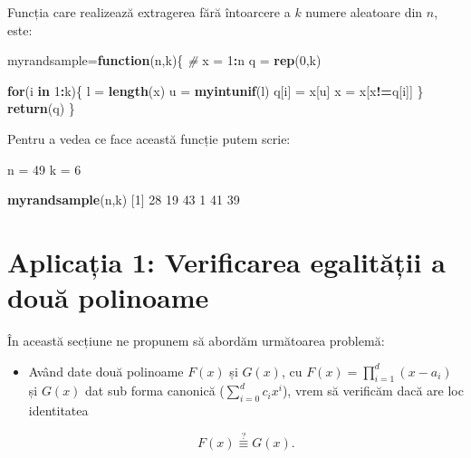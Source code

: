 \documentclass[]{article}
\newenvironment{Shaded}{\begin{snugshade}}{\end{snugshade}}
\newcommand{\KeywordTok}[1]{\textcolor[rgb]{0.13,0.29,0.53}{\textbf{#1}}}
\newcommand{\DecValTok}[1]{\textcolor[rgb]{0.00,0.00,0.81}{#1}}
\newcommand{\StringTok}[1]{\textcolor[rgb]{0.31,0.60,0.02}{#1}}
\newcommand{\CommentTok}[1]{\textcolor[rgb]{0.56,0.35,0.01}{\textit{#1}}}
\newcommand{\ControlFlowTok}[1]{\textcolor[rgb]{0.13,0.29,0.53}{\textbf{#1}}}
\newcommand{\OperatorTok}[1]{\textcolor[rgb]{0.81,0.36,0.00}{\textbf{#1}}}
\newcommand{\NormalTok}[1]{#1}
\newenvironment{frshaded*}{%
  \def\FrameCommand{\fboxrule=\FrameRule\fboxsep=\FrameSep \fcolorbox{framecolor}{shadecolor1}}%
  \MakeFramed {\advance\hsize-\width \FrameRestore}}%
{\endMakeFramed}
\newenvironment{rmdblock}[1]
  {\begin{frshaded*}
  \begin{itemize}
  \renewcommand{\labelitemi}{
    \raisebox{-.7\height}[0pt][0pt]{
      {\setkeys{Gin}{width=2em,keepaspectratio}\texttt{[image: images/icons/\#1]}}
    }
  }
  \item
  }
  {
  \end{itemize}
  \end{frshaded*}
  }
\newenvironment{rmdexercise}
  {\begin{rmdblock}{exercise}}
  {\end{rmdblock}}
\begin{document}
Funcția care realizează extragerea fără întoarcere a \(k\) numere
aleatoare din \(n\), este:

\begin{Shaded}
\begin{Highlighting}[]
\NormalTok{myrandsample=}\ControlFlowTok{function}\NormalTok{(n,k)\{}
  \CommentTok{# }
\NormalTok{  x =}\StringTok{ }\DecValTok{1}\OperatorTok{:}\NormalTok{n}
\NormalTok{  q =}\StringTok{ }\KeywordTok{rep}\NormalTok{(}\DecValTok{0}\NormalTok{,k)}
  
  \ControlFlowTok{for}\NormalTok{(i }\ControlFlowTok{in} \DecValTok{1}\OperatorTok{:}\NormalTok{k)\{}
\NormalTok{    l =}\StringTok{ }\KeywordTok{length}\NormalTok{(x)}
\NormalTok{    u =}\StringTok{ }\KeywordTok{myintunif}\NormalTok{(l)}
\NormalTok{    q[i] =}\StringTok{ }\NormalTok{x[u]}
\NormalTok{    x =}\StringTok{ }\NormalTok{x[x}\OperatorTok{!=}\NormalTok{q[i]]}
\NormalTok{  \}}
  \KeywordTok{return}\NormalTok{(q)}
\NormalTok{\}}
\end{Highlighting}
\end{Shaded}

Pentru a vedea ce face această funcție putem scrie:

\begin{Shaded}
\begin{Highlighting}[]
\NormalTok{n =}\StringTok{ }\DecValTok{49}
\NormalTok{k =}\StringTok{ }\DecValTok{6}

\KeywordTok{myrandsample}\NormalTok{(n,k)}
\NormalTok{[}\DecValTok{1}\NormalTok{] }\DecValTok{28} \DecValTok{19} \DecValTok{43}  \DecValTok{1} \DecValTok{41} \DecValTok{39}
\end{Highlighting}
\end{Shaded}

\section{Aplicația 1: Verificarea egalității a două
polinoame}\label{aplicatia-1-verificarea-egalitatii-a-doua-polinoame}

În această secțiune ne propunem să abordăm următoarea problemă:

\begin{rmdexercise}
Având date două polinoame \(F(x)\) și \(G(x)\), cu
\(F(x)=\prod_{i=1}^d(x-a_i)\) și \(G(x)\) dat sub forma canonică
(\(\sum_{i=0}^d c_ix^i\)), vrem să verificăm dacă are loc identitatea

\[
  F(x) \overset{?}{\equiv} G(x).
\]
\end{rmdexercise}
\end{document}
